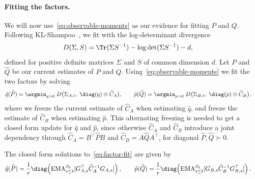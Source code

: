 \paragraph{Fitting the factors.} We will now use~\eqref{eq:observable-moments} as our evidence for fitting $P$ and $Q$.
Following
KL-Shampoo~\cite{klshampoo}, we fit with the log-determinant
divergence~\cite{logdetdiv}
\[
  D(\Sigma,S)=\Tr(\Sigma S^{-1})-\log\det(\Sigma S^{-1})-d,
\]
defined for positive definite matrices $\Sigma$ and $S$ of common
dimension $d$. Let $\widehat{P}$ and $\widehat {Q}$ be our current estimates of $P$ and $Q$.
Using~\eqref{eq:observable-moments} we fit the two factors by solving
\begin{equation}\label{eq:factor-fit}
  \hat{q}(\widehat P)
  =\argmin_{q>0}\;
  D\big(\Sigma_{A,t},\; \diag(q) \otimes \widehat C_A\big),
  \qquad
  \hat{p}(\widehat Q)
  =\argmin_{p>0}\;
  D\big(\Sigma_{B,t},\;\diag(p) \otimes \widehat C_B\big),
\end{equation}
where we freeze the current estimate of $\widehat C_A$ when estimating $\hat{q}$, and freeze the estimate of $\widehat C_B$ when estimating $\hat{p}$. This alternating freezing is needed to get a closed form update for $\hat{q}$ and $\hat{p}$, since otherwise $\widehat C_A$ and $\widehat C_B$ introduce a joint dependency through
$\widehat C_A=B^\top\widehat PB$ and
$\widehat C_B=A\widehat QA^\top$, for diagonal
$\widehat P,\widehat Q\succ0$.


The closed form solutions to~\eqref{eq:factor-fit} are given by
\begin{equation}
    \label{eq:factor-fit-sol}
      \hat{q}(\widehat P)=\frac1r\diag\!\left(\mathrm{EMA}_{s\leq t}^{\beta_2}[G_{A,s}^\top \widehat C_A^{-1}G_{A,s}]\right),
  \qquad
  \hat{p}(\widehat Q)=\frac1r\diag\!\left(\mathrm{EMA}_{s\leq t}^{\beta_2}[G_{B,s} \widehat C_B^{-1}G_{B,s}^\top]\right).
\end{equation}

